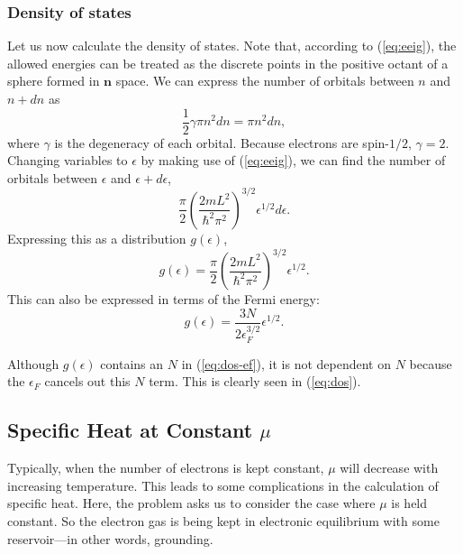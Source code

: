 \documentclass[12pt]{article}
\begin{document}
\subsubsection*{Density of states}

Let us now calculate the density of states.  Note that, according to (\ref{eq:eeig}), the allowed energies can be treated as the discrete points in the positive octant of a sphere formed in $\mathbf{n}$ space.  We can express the number of orbitals between $n$ and $n + \textit{d}n$ as 
\begin{equation}
	\frac{1}{2}\gamma \pi n^2 \textit{d}n = \pi n^2 \textit{d}n,
\end{equation}
where $\gamma$ is the degeneracy of each orbital.  Because electrons are spin-$1/2$, $\gamma = 2$.  Changing variables to $\epsilon$ by making use of (\ref{eq:eeig}), we can find the number of orbitals between $\epsilon$ and $\epsilon + \textit{d}\epsilon$, 
\[
	\frac{\pi}{2}\left( \frac{2mL^2}{\hbar^2 \pi^2} \right)^{3/2} \epsilon^{1/2} \textit{d}\epsilon.
\]
Expressing this as a distribution $g(\epsilon)$,
\begin{equation} \label{eq:dos}
	g(\epsilon) = \frac{\pi}{2}\left( \frac{2mL^2}{\hbar^2 \pi^2} \right)^{3/2} \epsilon^{1/2}.
\end{equation}
This can also be expressed in terms of the Fermi energy:
\begin{equation} \label{eq:dos-ef}
	g(\epsilon) = \frac{3N}{2\epsilon_F^{3/2}} \epsilon^{1/2}.
\end{equation}
\begin{remark}
	Although $g(\epsilon)$ contains an $N$ in (\ref{eq:dos-ef}), it is not dependent on $N$ because the $\epsilon_F$ cancels out this $N$ term. This is clearly seen in (\ref{eq:dos}).
\end{remark}

\subsection*{Specific Heat at Constant $\mu$ }
Typically, when the number of electrons is kept constant, $\mu$ will decrease with increasing temperature.  This leads to some complications in the calculation of specific heat.  Here, the problem asks us to consider the case where $\mu$ is held constant.  So the electron gas is being kept in electronic equilibrium with some reservoir---in other words, grounding.
\end{document}
